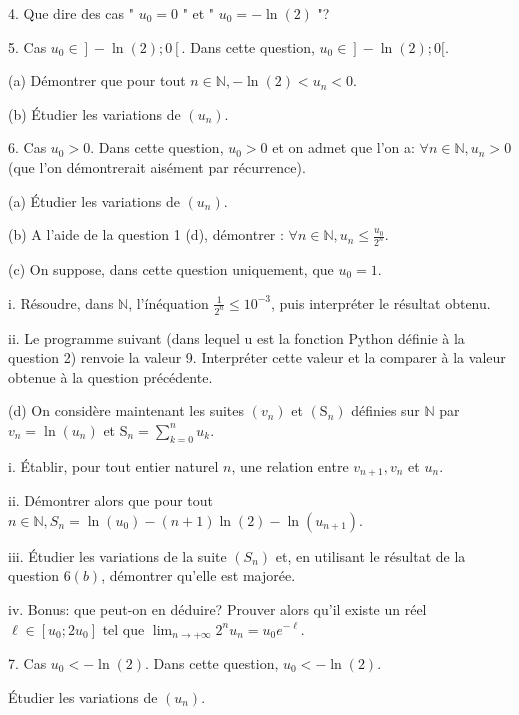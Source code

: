 \documentclass[a4paper, 11pt,reqno]{article}
\begin{document}
\begin{exercice}
4. Que dire des cas " $u_{0}=0$ " et " $u_{0}=-\ln (2)$ "?

5. Cas $\left.u_{0} \in\right]-\ln (2) ; 0\left[.\right.$ Dans cette question, $\left.u_{0} \in\right]-\ln (2) ; 0[$.

(a) Démontrer que pour tout $n \in \mathbb{N},-\ln (2)<u_{n}<0$.

(b) Étudier les variations de $\left(u_{n}\right)$.

6. Cas $u_{0}>0$. Dans cette question, $u_{0}>0$ et on admet que l'on a: $\forall n \in \mathbb{N}, u_{n}>0$ (que l'on démontrerait aisément par récurrence).

(a) Étudier les variations de $\left(u_{n}\right)$.

(b) A l'aide de la question 1 (d), démontrer : $\forall n \in \mathbb{N}, u_{n} \leq \frac{u_{0}}{2^{n}}$.

(c) On suppose, dans cette question uniquement, que $u_{0}=1$.

i. Résoudre, dans $\mathbb{N}$, l'ínéquation $\frac{1}{2^{n}} \leq 10^{-3}$, puis interpréter le résultat obtenu.

ii. Le programme suivant (dans lequel u est la fonction Python définie à la question 2) renvoie la valeur 9. Interpréter cette valeur et la comparer à la valeur obtenue à la question précédente.



(d) On considère maintenant les suites $\left(v_{n}\right)$ et $\left(\mathrm{S}_{n}\right)$ définies sur $\mathbb{N}$ par $v_{n}=\ln \left(u_{n}\right)$ et $\mathrm{S}_{n}=\sum_{k=0}^{n} u_{k}$.

i. Établir, pour tout entier naturel $n$, une relation entre $v_{n+1}, v_{n}$ et $u_{n}$.

ii. Démontrer alors que pour tout $n \in \mathbb{N}, S_{n}=\ln \left(u_{0}\right)-(n+1) \ln (2)-\ln \left(u_{n+1}\right)$.

iii. Étudier les variations de la suite $\left(S_{n}\right)$ et, en utilisant le résultat de la question $6(b)$, démontrer qu'elle est majorée.

iv. Bonus: que peut-on en déduire? Prouver alors qu'il existe un réel $\ell \in\left[u_{0} ; 2 u_{0}\right]$ tel que $\lim _{n \rightarrow+\infty} 2^{n} u_{n}=u_{0} e^{-\ell}$.

7. Cas $u_{0}<-\ln (2)$. Dans cette question, $u_{0}<-\ln (2)$.

Étudier les variations de $\left(u_{n}\right)$.


\end{exercice}
\end{document}
